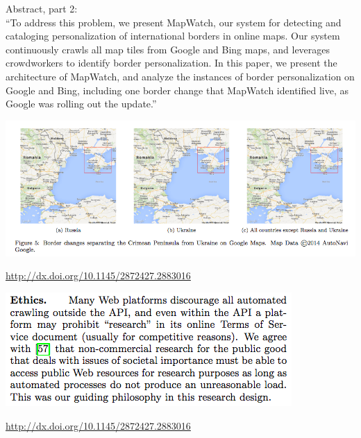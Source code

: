 \documentclass{beamer}
\def\vf{\vfill}
\begin{document}
\begin{frame}

Abstract, part 2:\\
``To address this problem, we present MapWatch, our system for detecting and cataloging personalization of international borders in online maps. Our system continuously crawls all map tiles from Google and Bing maps, and leverages crowdworkers to identify border personalization. In this paper, we present the architecture of MapWatch, and analyze the instances of border personalization on Google and Bing, including one border change that MapWatch identified live, as Google was rolling out the update.''

\end{frame}
\begin{frame}

\begin{center}
\includegraphics[width=\textwidth]{figures/soeller_mapwatch_2016_fig5.png}
\end{center}

\vf
\url{http://dx.doi.org/10.1145/2872427.2883016}
\end{frame}
\begin{frame}

\begin{center}
\includegraphics[width=\textwidth]{figures/soeller_mapwatch_2016_ethics.png}
\end{center}

\vf
\url{http://dx.doi.org/10.1145/2872427.2883016}
\end{frame}
\end{document}
